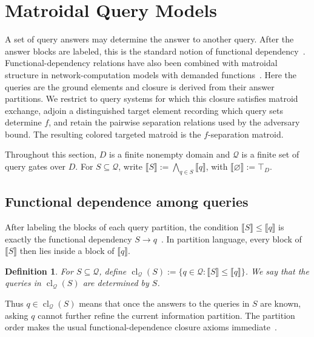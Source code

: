 \documentclass[11pt]{article}
\numberwithin{equation}{section}
\newtheorem{definition}{Definition}[section]
\theoremstyle{remark}
\begin{document}
\section{Matroidal Query Models}
\label{sec:matroidal-query-models}

A set of query answers may determine the answer to another query. After the answer blocks are labeled, this is the standard notion of functional dependency~\cite{Armstrong1974,Matus1991}. Functional-dependency relations have also been combined with matroidal structure in network-computation models with demanded functions~\cite{GuptaRajan2016}. Here the queries are the ground elements and closure is derived from their answer partitions. We restrict to query systems for which this closure satisfies matroid exchange, adjoin a distinguished target element recording which query sets determine $f$, and retain the pairwise separation relations used by the adversary bound. The resulting colored targeted matroid is the $f$-separation matroid.

Throughout this section, $D$ is a finite nonempty domain and $\mathcal Q$ is
a finite set of query gates over $D$. For $S\subseteq\mathcal Q$, write $\llbracket S\rrbracket:=\bigwedge_{q\in S}\llbracket q\rrbracket$, with $\llbracket\varnothing\rrbracket:=\top_D$.

\subsection{Functional dependence among queries}
\label{subsec:functional-query-dependence}

After labeling the blocks of each query partition, the condition $\llbracket S\rrbracket\leq\llbracket q\rrbracket$ is exactly the functional dependency $S\to q$~\cite{Armstrong1974,Matus1991}. In partition language, every block of $\llbracket S\rrbracket$ then lies inside a block of $\llbracket q\rrbracket$.

\begin{definition}
\label{def:query-closure}
For $S\subseteq\mathcal Q$, define $\operatorname{cl}_{\mathcal Q}(S):=\{q\in\mathcal Q:\llbracket S\rrbracket\leq\llbracket q\rrbracket\}$. We say that the queries in $\operatorname{cl}_{\mathcal Q}(S)$ are
\emph{determined by} $S$.
\end{definition}

Thus $q\in\operatorname{cl}_{\mathcal Q}(S)$ means that once the answers to
the queries in $S$ are known, asking $q$ cannot further refine the current
information partition. The partition order makes the usual
functional-dependence closure axioms immediate~\cite{Armstrong1974,Matus1991}.
\end{document}
